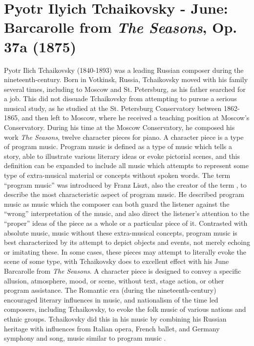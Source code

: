 \chapter[Tchaikovsky's June: Barcarolle from \textit{The Seasons}, Op. 37a]{Pyotr Ilyich Tchaikovsky - June: Barcarolle from \textit{The Seasons}, Op. 37a (1875)}

Pyotr Ilich Tchaikovsky (1840-1893) was a leading Russian composer during the nineteenth-century. Born in Votkinsk, Russia, Tchaikovsky moved with his family several times, including to Moscow and St. Petersburg, as his father searched for a job\autocite{Burkholder_Grout_Palisca_2014}. This did not dissuade Tchaikovsky from attempting to pursue a serious musical study, as he studied at the St. Petersburg Conservatory between 1862-1865, and then left to Moscow, where he received a teaching position at Moscow's Conservatory. During his time at the Moscow Conservatory, he composed his work \textit{The Seasons}, twelve character pieces for piano. A character piece is a type of program music. Program music is defined as a type of music which tells a story, able to illustrate various literary ideas or evoke pictorial scenes\autocite{Kennedy_Kennedy_Rutherford-Johnson_2013a}, and this definition can be expanded to include all music which attempts to represent some type of extra-musical material or concepts without spoken words\autocite{Scruton_2001}. The term ``program music'' was introduced by Franz Liszt, also the creator of the term , to describe the most characteristic aspect of program music. He described program music as music which the composer can both guard the listener against the ``wrong'' interpretation of the music, and also direct the listener's attention to the ``proper'' ideas of the piece as a whole or a particular piece of it. Contrasted with absolute music, music without these extra-musical concepts, program music is best characterized by its attempt to depict objects and events, not merely echoing or imitating these. In some cases, these pieces may attempt to literally evoke the scene of some type, with Tchaikovsky does to excellent effect with his June Barcarolle from \textit{The Seasons}. A character piece is designed to convey a specific allusion, atmosphere, mood, or scene, without text, stage action, or other program assistance\autocite{Temperley_2011}. The Romantic era (during the nineteenth-century) encouraged literary influences in music, and nationalism of the time led composers, including Tchaikovsky, to evoke the folk music of various nations and ethnic groups. Tchaikovsky did this in his music by combining his Russian heritage with influences from Italian opera, French ballet, and Germany symphony and song, music similar to program music \autocite{Burkholder_Grout_Palisca_2014}.

